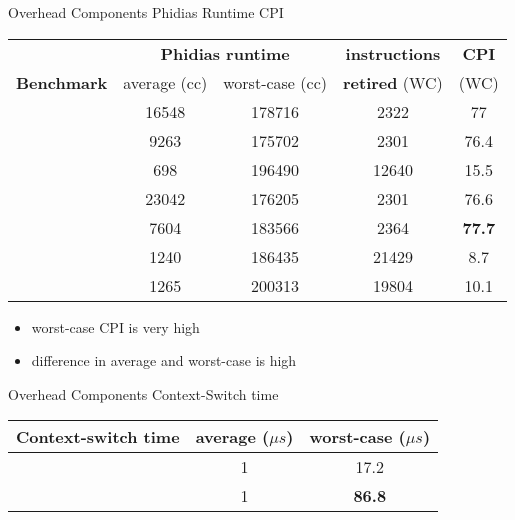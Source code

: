 \documentclass[10pt,hyperref={hyperfootnotes=false}, xcolor={usenames, dvipsnames}]{beamer}
\begin{document}
\begin{frame}[allowframebreaks]{Overhead Components} {Phidias Runtime CPI}
	\begin{table}[H]
	\centering
	\begin{tabular}{|c|c|c|c|c|}  
	\hline
							& \multicolumn{2}{|c|}{\textbf{Phidias runtime}} & \textbf{instructions}	& \textbf{CPI} \\
	\textbf{Benchmark}		& average (cc)	&	worst-case (cc)	&	\textbf{retired} (WC) &	(WC) \\ \hline 
	\mcachepressure{}	& 16548	& 178716 & 2322 & 77 \\ \hline
	\mforkops{}		& 9263 & 175702 & 2301 & 76.4 \\ \hline
	\mfileops{}		& 698 & 196490 & 12640 & 15.5 \\ \hline
	\mhackbench{} 		& 23042 & 176205 & 2301 & 76.6 \\ \hline
	\mmmapops{} 		& 7604 & 183566 & 2364 & \textbf{77.7} \\ \hline
	\mstdout{} 			& 1240 & 186435 & 21429 & 8.7 \\ \hline
	\mthreadops{} 		& 1265 & 200313 & 19804 & 10.1 \\ \hline
	\end{tabular}
	\end{table}

	\begin{itemize}
		\item {worst-case CPI is very high}
		\item {difference in average and worst-case is high}
	\end{itemize}
\end{frame}

\begin{frame}[allowframebreaks]{Overhead Components} {Context-Switch time}
	\begingroup
	
	\endgroup	    
	\begin{table}[H]
	\centering
	\begin{tabular}{|c||c|c|}  
	\hline
		Context-switch time	&	average ($\mu{}s$)	&	worst-case ($\mu{}s$) \\ \hline \hline
		\mnoload{}				&	1			& 		17.2 \\ \hline
		\mcachepressure{}		&	1			& \textbf{86.8}\\ \hline
	\end{tabular}
	\end{table}
\end{frame}
\end{document}

